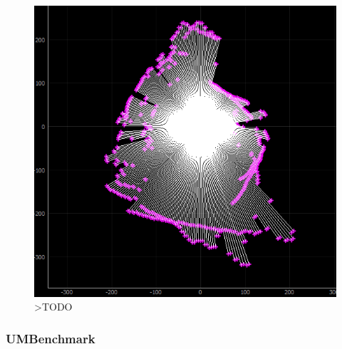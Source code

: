 \begin{figure}[ht]
	\centering
		\includegraphics[width=0.5\linewidth]{rys/ScanBot-12-calibrated-room-map4.PNG}
	\caption{>TODO}
	\label{fig:xxx}
\end{figure}


\subsubsection{UMBenchmark\cite{Borenstein1995}}



